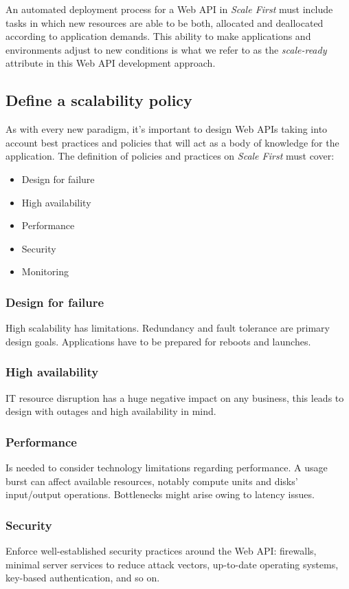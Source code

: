 \documentclass[10pt,article]{IEEEtran}
\begin{document}
An automated deployment process for a Web API in \textit{Scale First} must include tasks in which new resources are able to be both, allocated and deallocated according to application demands. This ability to make applications and environments adjust to new conditions is what we refer to as the \textit{scale-ready} attribute in this Web API development approach. 
 

\subsection{Define a scalability policy}
As with every new paradigm, it's important to design Web APIs taking into account best practices and policies that will act as a body of knowledge for the application.
The definition of policies and practices on \textit{Scale First} must cover:
\begin{itemize}
    \item
    Design for failure
    \item
    High availability
    \item
    Performance
    \item
    Security
    \item
    Monitoring
\end{itemize}

\subsubsection{Design for failure}
High scalability has limitations. Redundancy and fault tolerance are primary design goals. Applications have  to be prepared for reboots and launches.

\subsubsection{High availability}
IT resource disruption has a huge negative impact on any business, this leads to design with outages and high availability in mind.

\subsubsection{Performance}
Is needed to consider technology limitations regarding performance. A usage burst can affect available resources, notably compute units and disks' input/output operations. Bottlenecks might arise owing to latency issues. 

\subsubsection{Security}
Enforce well-established security practices around the Web API: firewalls, minimal server services to reduce attack vectors, up-to-date operating systems, key-based authentication, and so on.
\end{document}

